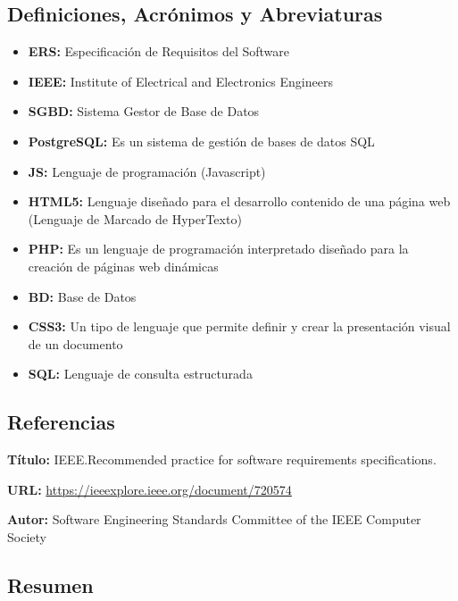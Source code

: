 	\subsection{Definiciones, Acrónimos y Abreviaturas}

	\begin{itemize}
		\item \textbf{ERS:} Especificación de Requisitos del Software

		\item \textbf{IEEE:} Institute of Electrical and Electronics Engineers

		\item \textbf{SGBD:} Sistema Gestor de Base de Datos

		\item \textbf{PostgreSQL:} Es un sistema de gestión de bases de datos SQL

		\item \textbf{JS:} Lenguaje de programación (Javascript)

		\item \textbf{HTML5:} Lenguaje diseñado para el desarrollo contenido de una
			página web (Lenguaje de Marcado de HyperTexto)

		\item \textbf{PHP:} Es un lenguaje de programación interpretado diseñado
			para la creación de páginas web dinámicas

		\item \textbf{BD:} Base de Datos

		\item \textbf{CSS3:} Un tipo de lenguaje que permite definir y crear la
			presentación visual de un documento

		\item \textbf{SQL:} Lenguaje de consulta estructurada
	\end{itemize}

	\subsection{Referencias}

	\textbf{Título:} IEEE.Recommended practice for software requirements
	specifications.

	\textbf{URL:} \url{https://ieeexplore.ieee.org/document/720574}

	\textbf{Autor:} Software Engineering Standards Committee of the IEEE Computer Society

	\subsection{Resumen}

